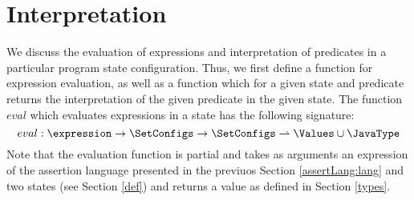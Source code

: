 

\newtheorem{interpExpr}{Definition}[subsection]
\newtheorem{interpTypeExpr}[interpExpr]{Definition} 
\newtheorem{interpPred}[interpExpr]{Definition}


\section{Interpretation}\label{interpret}

We discuss the evaluation of expressions and interpretation of predicates  in a particular program state configuration.
Thus, we first define a function for expression evaluation, as well as a function which for a given state and predicate returns the interpretation
of the given predicate in the given state. 
The function $eval$ which evaluates expressions in a state has the following signature:
$$
eval : \expression \rightarrow \SetConfigs  \rightarrow \SetConfigs  \rightharpoonup \Values \cup \JavaType
$$
Note that the evaluation function is partial and  takes as arguments an expression of the assertion language presented in the previuos Section 
\ref{assertLang:lang} and two states (see Section \ref{def})  and returns a value as defined in Section \ref{types}. 



